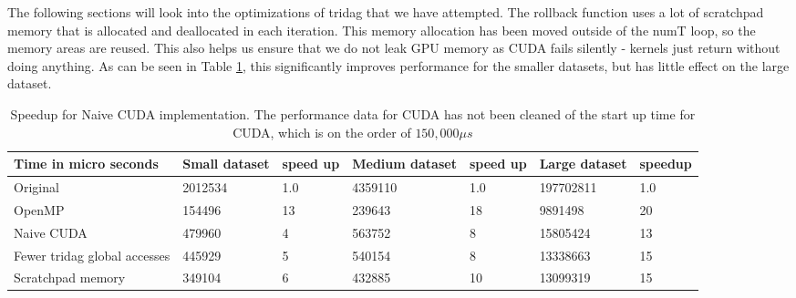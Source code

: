 \documentclass{article}
\begin{document}
The following sections will look into the optimizations of tridag that we have attempted.
\newline\newline
The rollback function uses a lot of scratchpad memory that is allocated and deallocated in each iteration. This memory allocation has been moved outside of the numT loop, so the memory areas are reused. This also helps us ensure that we do not leak GPU memory as CUDA fails silently - kernels just return without doing anything. As can be seen in Table \ref{cuda-naive}, this significantly improves performance for the smaller datasets, but has little effect on the large dataset.

\begin{table}[ht]
\centering
\caption{Speedup for Naive CUDA implementation. The performance data for CUDA has not been cleaned of the start up time for CUDA, which is on the order of $150,000 \mu s$\newline}
\label{cuda-naive}
\begin{tabular}{|l|l|l|l|l|l|l|}
\hline
Time in micro seconds & Small dataset & speed up & Medium dataset & speed up & Large dataset & speedup  \\ \hline
Original         & 2012534       &  1.0        & 4359110        &  1.0        & 197702811     &  1.0      \\ \hline
OpenMP           & 154496        &  13         & 239643         &  18         & 9891498       &  20       \\ \hline
Naive CUDA       & 479960        &  4          & 563752         &  8          & 15805424      &  13       \\ \hline
Fewer tridag global accesses & 445929 &  5     & 540154         &  8          & 13338663      &  15       \\ \hline
Scratchpad memory & 349104       &  6          & 432885         &  10         & 13099319      &  15       \\ \hline
\end{tabular}
\end{table}
\end{document}

